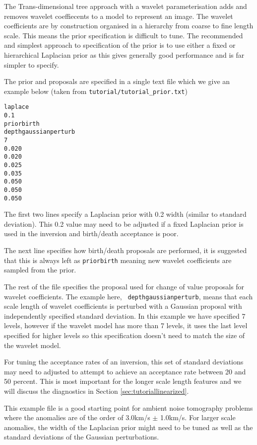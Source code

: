 \documentclass[a4paper,12pt]{article}
\begin{document}
The Trans-dimensional tree approach with a wavelet parameterisation adds and removes
wavelet coeffiecents to a model to represent an image. The wavelet coefficients are
by construction organised in a hierarchy from coarse to fine length scale. This
means the prior specification is difficult to tune. The recommended and simplest
approach to specification of the prior is to use either a fixed or hierarchical
Laplacian prior as this gives generally good performance and is far simpler to
specify.

The prior and proposals are specified in a single text file which we give
an example below (taken from {\tt tutorial/tutorial\_prior.txt})

\begin{verbatim}
laplace
0.1
priorbirth
depthgaussianperturb
7
0.020
0.020
0.025
0.035
0.050
0.050
0.050
\end{verbatim}

The first two lines specify a Laplacian prior with 0.2 width (similar to standard
deviation). This 0.2 value may need to be adjusted if a fixed Laplacian prior is
used in the inversion and birth/death acceptance is poor.

The next line specifies how birth/death proposals are performed, it is
suggested that this is always left as {\tt priorbirth} meaning new
wavelet coefficients are sampled from the prior.

The rest of the file specifies the proposal used for change of value
proposals for wavelet coefficients. The example here, {\tt
  depthgaussianperturb}, means that each scale length of wavelet
coefficients is perturbed with a Gaussian proposal with independently
specified standard deviation. In this example we have specified 7
levels, however if the wavelet model has more than 7 levels, it uses
the last level specified for higher levels so this specification
doesn't need to match the size of the wavelet model.

For tuning the acceptance rates of an inversion, this set of standard
deviations may need to adjusted to attempt to achieve an acceptance
rate between 20 and 50 percent. This is most important for the longer
scale length features and we will discuss the diagnostics in Section
\ref{sec:tutoriallinearized}.

This example file is a good starting point for ambient noise
tomography problems where the anomalies are of the order of 3.0km/s
$\pm$ 1.0km/s. For larger scale anomalies, the width of the Laplacian
prior might need to be tuned as well as the standard deviations of the
Gaussian perturbations.
\end{document}
